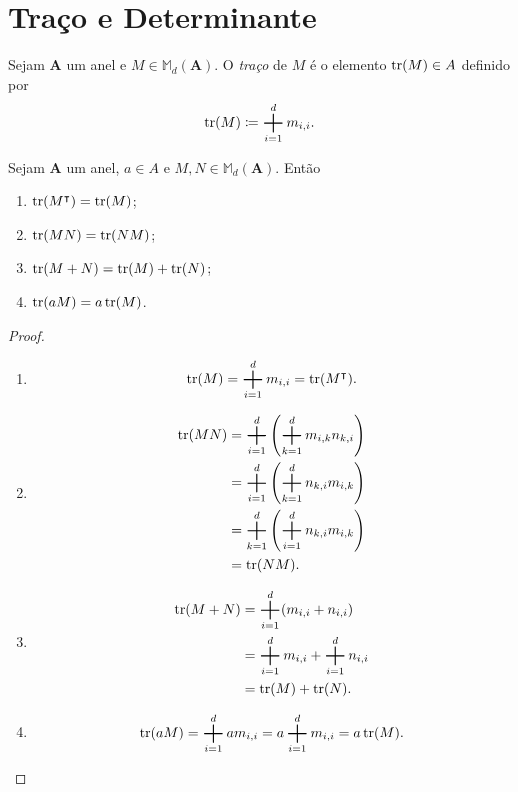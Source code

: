 \section{Traço e Determinante}

\begin{defi}
	Sejam $\bm A$ um anel e $M \in \mathbb M_d(\bm A)$. O \emph{traço} de $M$ é o elemento $\operatorname{tr}(M) \in A$ definido por
	\begin{equation*}
	\tr(M) \coloneqq \bigsum_{i=1}^d m_{i,i}.
	\end{equation*}
\end{defi}

\begin{prop}
	Sejam $\bm A$ um anel, $a \in A$ e $M,N \in \mathbb M_d(\bm A)$. Então
	\begin{enumerate}
	\item $\operatorname{tr}(M^\intercal)=\operatorname{tr}(M)$;
	\item $\operatorname{tr}(MN)=\operatorname{tr}(NM)$;
	\item $\operatorname{tr}(M+N)=\operatorname{tr}(M)+\operatorname{tr}(N)$;
	\item $\operatorname{tr}(aM)=a\operatorname{tr}(M)$.
	\end{enumerate}
\end{prop}
\begin{proof}
	\begin{enumerate}
	\item
		\begin{equation*}
		\tr(M) = \bigsum_{i=1}^d m_{i,i} = \tr(M^\intercal).
		\end{equation*}
	\item
		\begin{align*}
		\tr(MN) &= \bigsum_{i=1}^d \left(\bigsum_{k=1}^d m_{i,k}n_{k,i}\right) \\
		&= \bigsum_{i=1}^d \left(\bigsum_{k=1}^d n_{k,i}m_{i,k}\right) \\
		&= \bigsum_{k=1}^d \left(\bigsum_{i=1}^d n_{k,i}m_{i,k}\right) \\
		&= \tr(NM).
		\end{align*}
	\item
		\begin{align*}
		\tr(M+N) &= \bigsum_{i=1}^d (m_{i,i} + n_{i,i}) \\
		&= \bigsum_{i=1}^d m_{i,i} + \bigsum_{i=1}^d n_{i,i} \\
		&= \tr(M) + \tr(N).
		\end{align*}
	\item
		\begin{equation*}
		\tr(aM) = \bigsum_{i=1}^d am_{i,i} = a\bigsum_{i=1}^d m_{i,i} = a\tr(M).
		\end{equation*}
\qedhere
	\end{enumerate}
\end{proof}














